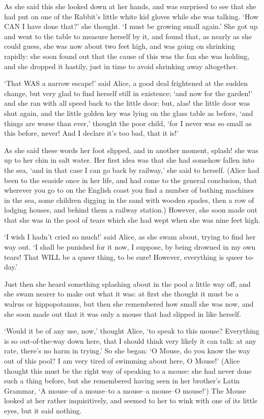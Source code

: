 \documentclass[12pt]{book}
\begin{document}
  As she said this she looked down at her hands, and was
surprised to see that she had put on one of the Rabbit's little
white kid gloves while she was talking.  `How CAN I have done
that?' she thought.  `I must be growing small again.'  She got up
and went to the table to measure herself by it, and found that,
as nearly as she could guess, she was now about two feet high,
and was going on shrinking rapidly:  she soon found out that the
cause of this was the fan she was holding, and she dropped it
hastily, just in time to avoid shrinking away altogether.

`That WAS a narrow escape!' said Alice, a good deal frightened at
the sudden change, but very glad to find herself still in
existence; `and now for the garden!' and she ran with all speed
back to the little door:  but, alas! the little door was shut
again, and the little golden key was lying on the glass table as
before, `and things are worse than ever,' thought the poor child,
`for I never was so small as this before, never!  And I declare
it's too bad, that it is!'

  As she said these words her foot slipped, and in another
moment, splash! she was up to her chin in salt water.  Her first
idea was that she had somehow fallen into the sea, `and in that
case I can go back by railway,' she said to herself.  (Alice had
been to the seaside once in her life, and had come to the general
conclusion, that wherever you go to on the English coast you find
a number of bathing machines in the sea, some children digging in
the sand with wooden spades, then a row of lodging houses, and
behind them a railway station.)  However, she soon made out that
she was in the pool of tears which she had wept when she was nine
feet high.

  `I wish I hadn't cried so much!' said Alice, as she swam about,
trying to find her way out.  `I shall be punished for it now, I
suppose, by being drowned in my own tears!  That WILL be a queer
thing, to be sure!  However, everything is queer to-day.'

  Just then she heard something splashing about in the pool a
little way off, and she swam nearer to make out what it was:  at
first she thought it must be a walrus or hippopotamus, but then
she remembered how small she was now, and she soon made out that
it was only a mouse that had slipped in like herself.

  `Would it be of any use, now,' thought Alice, `to speak to this
mouse?  Everything is so out-of-the-way down here, that I should
think very likely it can talk:  at any rate, there's no harm in
trying.'  So she began:  `O Mouse, do you know the way out of
this pool?  I am very tired of swimming about here, O Mouse!'
(Alice thought this must be the right way of speaking to a mouse:
she had never done such a thing before, but she remembered having
seen in her brother's Latin Grammar, `A mouse--of a mouse--to a
mouse--a mouse--O mouse!')  The Mouse looked at her rather
inquisitively, and seemed to her to wink with one of its little
eyes, but it said nothing.
\end{document}
